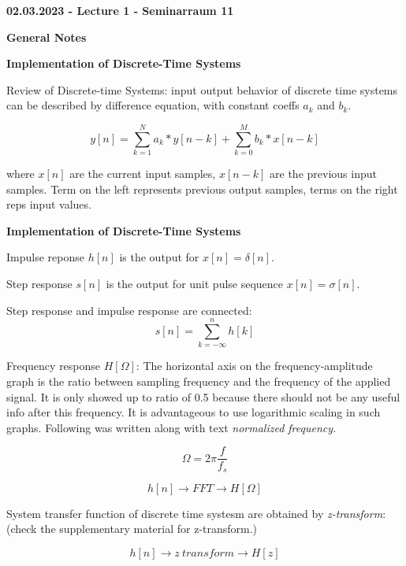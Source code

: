 \textbf{02.03.2023 - Lecture 1 - Seminarraum 11}

\vspace{5mm}
\textbf{General Notes}

\textbf{Implementation of Discrete-Time Systems}

Review of Discrete-time Systems: input output behavior of discrete time systems can be described by difference equation, with constant coeffs $a_k$ and $b_k$.

$$
y[n] = \sum_{k=1}^{N} a_k*y[n-k] + \sum_{k=0}^{M} b_k*x[n-k]
$$

where $x[n]$ are the current input samples, $x[n-k]$ are the previous input samples. Term on the left represents previous output samples, terms on the right reps input values.

\textbf{Implementation of Discrete-Time Systems}

Impulse reponse $h[n]$ is the output for $x[n] = \delta[n]$.

Step response $s[n]$ is the output for unit pulse sequence $x[n] = \sigma[n]$.

Step response and impulse response are connected: $$ s[n] = \sum_{k=-\infty}^{n}h[k]$$

Frequency response $H[\Omega]$: The horizontal axis on the frequency-amplitude graph is the ratio between sampling frequency and the frequency of the applied signal. It is only showed up to ratio of 0.5 because there should not be any useful info after this frequency. It is advantageous to use logarithmic scaling in such graphs. Following was written along with text \textit{normalized frequency.}

$$\Omega = 2\pi \frac{f}{f_s}$$

$$ h[n] \rightarrow FFT \rightarrow H[\Omega] $$

System transfer function of discrete time systesm are obtained by \textit{z-transform}: (check the supplementary material  for z-transform.)

$$ h[n] \rightarrow z\ transform \rightarrow H[z] $$

